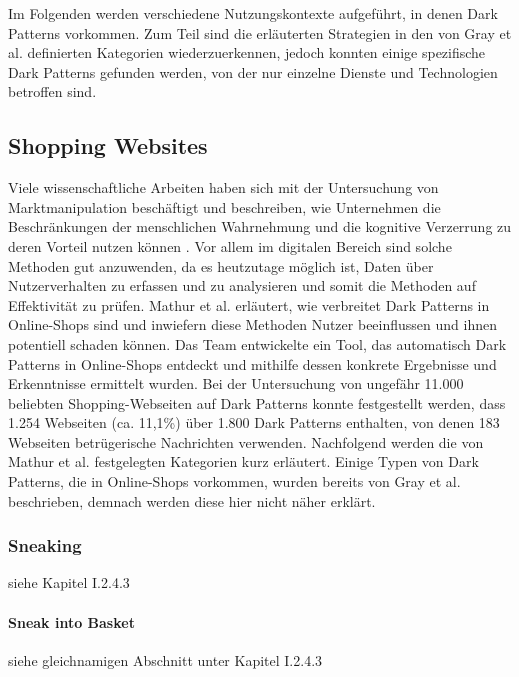 \documentclass[a4paper]{article}
\newcommand{\todo}[1]{{\color{purple}{#1}}}
\begin{document}
Im Folgenden werden verschiedene Nutzungskontexte aufgeführt, in denen Dark Patterns vorkommen. Zum Teil sind die erläuterten Strategien in den von Gray et al. definierten Kategorien wiederzuerkennen, jedoch konnten einige spezifische Dark Patterns gefunden werden, von der nur einzelne Dienste und Technologien betroffen sind.


\subsection{Shopping Websites}
\label{sub:shopping}
Viele wissenschaftliche Arbeiten haben sich mit der Untersuchung von Marktmanipulation beschäftigt und beschreiben, wie Unternehmen die Beschränkungen der menschlichen Wahrnehmung und die kognitive Verzerrung zu deren Vorteil nutzen können \cite{mathur}\cite{narayanan}. Vor allem im digitalen Bereich sind solche Methoden gut anzuwenden, da es heutzutage möglich ist, Daten über Nutzerverhalten zu erfassen und zu analysieren und somit die Methoden auf Effektivität zu prüfen.\newline\newline
Mathur et al. erläutert, wie verbreitet Dark Patterns in Online-Shops sind und inwiefern diese Methoden Nutzer beeinflussen und ihnen potentiell schaden können. Das Team entwickelte ein Tool, das automatisch Dark Patterns in Online-Shops entdeckt und mithilfe dessen konkrete Ergebnisse und Erkenntnisse ermittelt wurden. Bei der Untersuchung von ungefähr 11.000 beliebten Shopping-Webseiten auf Dark Patterns konnte festgestellt werden, dass 1.254 Webseiten (ca. 11,1\%) über 1.800 Dark Patterns enthalten, von denen 183 Webseiten betrügerische Nachrichten verwenden.\newline\newline     
Nachfolgend werden die von Mathur et al. festgelegten Kategorien kurz erläutert. Einige Typen von Dark Patterns, die in Online-Shops vorkommen, wurden bereits von Gray et al. beschrieben, demnach werden diese hier nicht näher erklärt. 

\subsubsection{Sneaking}
siehe Kapitel I.2.4.3 
\todo{Verlinkung hinzufügen}

\paragraph{Sneak into Basket}
siehe gleichnamigen Abschnitt unter Kapitel I.2.4.3 
\todo{Verlinkung hinzufügen}
\end{document}
